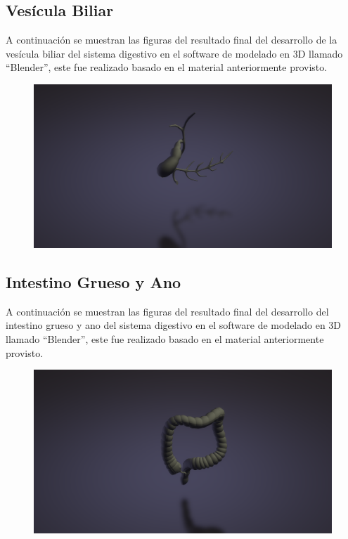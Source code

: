 \subsection{Vesícula Biliar}
A continuación se muestran las figuras del resultado final del desarrollo de la vesícula biliar del sistema digestivo en el software de modelado en 3D llamado “Blender”, este fue realizado basado en el material anteriormente provisto.\\
\begin{figure}[H]
	\begin{center}
 		\includegraphics[width = .5\textwidth]{source/images/image26.png}
	\end{center} 
\end{figure}

\subsection{Intestino Grueso y Ano}
A continuación se muestran las figuras del resultado final del desarrollo del intestino grueso y ano del sistema digestivo en el software de modelado en 3D llamado “Blender”, este fue realizado basado en el material anteriormente provisto.\\
\begin{figure}[H]
	\begin{center}
 		\includegraphics[width = .5\textwidth]{source/images/image20.png}
	\end{center} 
\end{figure}

